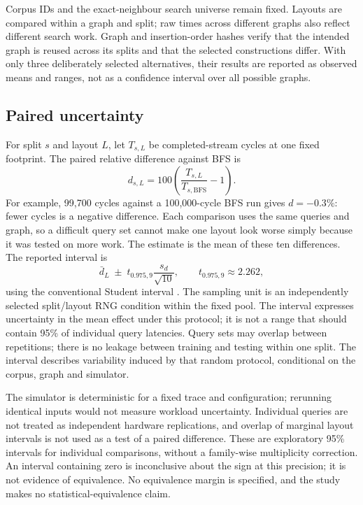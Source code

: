 \documentclass[11pt,a4paper]{report}
\begin{document}
Corpus IDs and the exact-neighbour search universe remain fixed. Layouts are compared within a graph and split; raw times across different graphs also reflect different search work. Graph and insertion-order hashes verify that the intended graph is reused across its splits and that the selected constructions differ. With only three deliberately selected alternatives, their results are reported as observed means and ranges, not as a confidence interval over all possible graphs.

\subsection{Paired uncertainty}
\label{sec:paired}
For split $s$ and layout $L$, let $T_{s,L}$ be completed-stream cycles at one fixed footprint. The paired relative difference against BFS is
\begin{equation}
 d_{s,L}=100\left(\frac{T_{s,L}}{T_{s,\mathrm{BFS}}}-1\right).
\end{equation}
For example, 99,700 cycles against a 100,000-cycle BFS run gives $d=-0.3\%$: fewer cycles is a negative difference. Each comparison uses the same queries and graph, so a difficult query set cannot make one layout look worse simply because it was tested on more work. The estimate is the mean of these ten differences. The reported interval is
\begin{equation}
 \bar d_L\;\pm\;t_{0.975,9}\frac{s_d}{\sqrt{10}},\qquad t_{0.975,9}\approx2.262,
\end{equation}
using the conventional Student interval \cite{student}. The sampling unit is an independently selected split/layout RNG condition within the fixed pool. The interval expresses uncertainty in the mean effect under this protocol; it is not a range that should contain 95\% of individual query latencies. Query sets may overlap between repetitions; there is no leakage between training and testing within one split. The interval describes variability induced by that random protocol, conditional on the corpus, graph and simulator.

The simulator is deterministic for a fixed trace and configuration; rerunning identical inputs would not measure workload uncertainty. Individual queries are not treated as independent hardware replications, and overlap of marginal layout intervals is not used as a test of a paired difference. These are exploratory 95\% intervals for individual comparisons, without a family-wise multiplicity correction. An interval containing zero is inconclusive about the sign at this precision; it is not evidence of equivalence. No equivalence margin is specified, and the study makes no statistical-equivalence claim.
\end{document}
